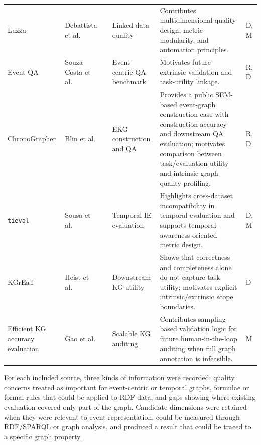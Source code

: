 \begin{table}[htbp]
\begin{tabularx}{\textwidth}{>{\raggedright\arraybackslash}p{2.4cm}>{\raggedright\arraybackslash}p{1.9cm}>{\raggedright\arraybackslash}p{0.7cm}>{\raggedright\arraybackslash}p{2.0cm}X>{\raggedright\arraybackslash}p{0.8cm}}
Luzzu \citep{luzzu2016} & Debattista et al. & 2016 & Linked data quality & Contributes multidimensional quality design, metric modularity, and automation principles. & D, M \\
Event-QA \citep{eventqa2020} & Souza Costa et al. & 2020 & Event-centric QA benchmark & Motivates future extrinsic validation and task-utility linkage. & R, D \\
ChronoGrapher \citep{chronographer2023} & Blin et al. & 2025 & EKG construction and QA & Provides a public SEM-based event-graph construction case with construction-accuracy and downstream QA evaluation; motivates comparison between task/evaluation utility and intrinsic graph-quality profiling. & R, D \\
\texttt{tieval} \citep{tieval2023} & Sousa et al. & 2023 & Temporal IE evaluation & Highlights cross-dataset incompatibility in temporal evaluation and supports temporal-awareness-oriented metric design. & D, M \\
KGrEaT \citep{kgreat2023} & Heist et al. & 2023 & Downstream KG utility & Shows that correctness and completeness alone do not capture task utility; motivates explicit intrinsic/extrinsic scope boundaries. & D \\
Efficient KG accuracy evaluation \citep{efficienteval2019} & Gao et al. & 2019 & Scalable KG auditing & Contributes sampling-based validation logic for future human-in-the-loop auditing when full graph annotation is infeasible. & M \\
\bottomrule
\end{tabularx}
\end{table}

For each included source, three kinds of information were recorded: quality concerns treated as important for event-centric or temporal graphs, formulae or formal rules that could be applied to RDF data, and gaps showing where existing evaluation covered only part of the graph. Candidate dimensions were retained when they were relevant to event representation, could be measured through RDF/SPARQL or graph analysis, and produced a result that could be traced to a specific graph property.

